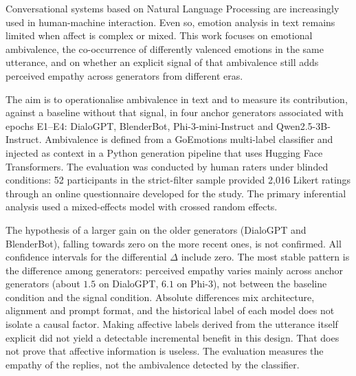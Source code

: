 \begin{abstractotherlanguage}

Conversational systems based on Natural Language Processing are increasingly used in human-machine interaction. Even so, emotion analysis in text remains limited when affect is complex or mixed. This work focuses on emotional ambivalence, the co-occurrence of differently valenced emotions in the same utterance, and on whether an explicit signal of that ambivalence still adds perceived empathy across generators from different eras.

The aim is to operationalise ambivalence in text and to measure its contribution, against a baseline without that signal, in four anchor generators associated with epochs E1--E4: DialoGPT, BlenderBot, Phi-3-mini-Instruct and Qwen2.5-3B-Instruct. Ambivalence is defined from a GoEmotions multi-label classifier and injected as context in a Python generation pipeline that uses Hugging Face Transformers. The evaluation was conducted by human raters under blinded conditions: 52 participants in the strict-filter sample provided 2,016 Likert ratings through an online questionnaire developed for the study. The primary inferential analysis used a mixed-effects model with crossed random effects.

The hypothesis of a larger gain on the older generators (DialoGPT and BlenderBot), falling towards zero on the more recent ones, is not confirmed. All confidence intervals for the differential \(\Delta\) include zero. The most stable pattern is the difference among generators: perceived empathy varies mainly across anchor generators (about \(1.5\) on DialoGPT, \(6.1\) on Phi-3), not between the baseline condition and the signal condition. Absolute differences mix architecture, alignment and prompt format, and the historical label of each model does not isolate a causal factor. Making affective labels derived from the utterance itself explicit did not yield a detectable incremental benefit in this design. That does not prove that affective information is useless. The evaluation measures the empathy of the replies, not the ambivalence detected by the classifier.

\end{abstractotherlanguage}



